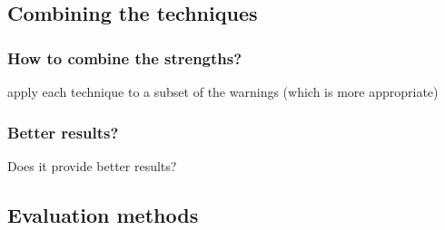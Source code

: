 \documentclass{article}
\begin{document}

\subsection{Combining the techniques}

\subsubsection{How to combine the strengths?}
apply each technique to a subset of the warnings (which is more appropriate)

\subsubsection{Better results?}
Does it provide better results?


\subsection{Evaluation methods}
\end{document}
